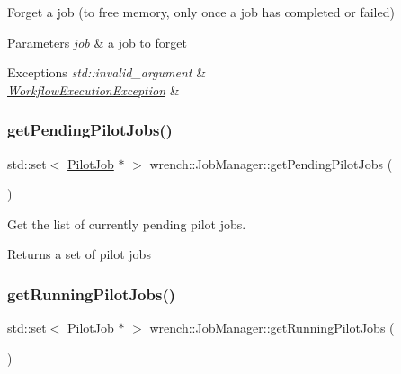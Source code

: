 Forget a job (to free memory, only once a job has completed or failed) 


\begin{DoxyParams}{Parameters}
{\em job} & a job to forget\\
\hline
\end{DoxyParams}

\begin{DoxyExceptions}{Exceptions}
{\em std\+::invalid\+\_\+argument} & \\
\hline
{\em \hyperlink{classwrench_1_1_workflow_execution_exception}{Workflow\+Execution\+Exception}} & \\
\hline
\end{DoxyExceptions}
\mbox{\label{classwrench_1_1_job_manager_ad7f55858aa45b87289d5f35c4ccfad56}} 
\subsubsection{\texorpdfstring{get\+Pending\+Pilot\+Jobs()}{getPendingPilotJobs()}}
{\footnotesize\ttfamily std\+::set$<$ \hyperlink{classwrench_1_1_pilot_job}{Pilot\+Job} $\ast$ $>$ wrench\+::\+Job\+Manager\+::get\+Pending\+Pilot\+Jobs (\begin{DoxyParamCaption}{ }\end{DoxyParamCaption})}



Get the list of currently pending pilot jobs. 

\begin{DoxyReturn}{Returns}
a set of pilot jobs 
\end{DoxyReturn}
\mbox{\label{classwrench_1_1_job_manager_aeb91b23edf40378e49929f47e95f1ea6}} 
\subsubsection{\texorpdfstring{get\+Running\+Pilot\+Jobs()}{getRunningPilotJobs()}}
{\footnotesize\ttfamily std\+::set$<$ \hyperlink{classwrench_1_1_pilot_job}{Pilot\+Job} $\ast$ $>$ wrench\+::\+Job\+Manager\+::get\+Running\+Pilot\+Jobs (\begin{DoxyParamCaption}{ }\end{DoxyParamCaption})}



